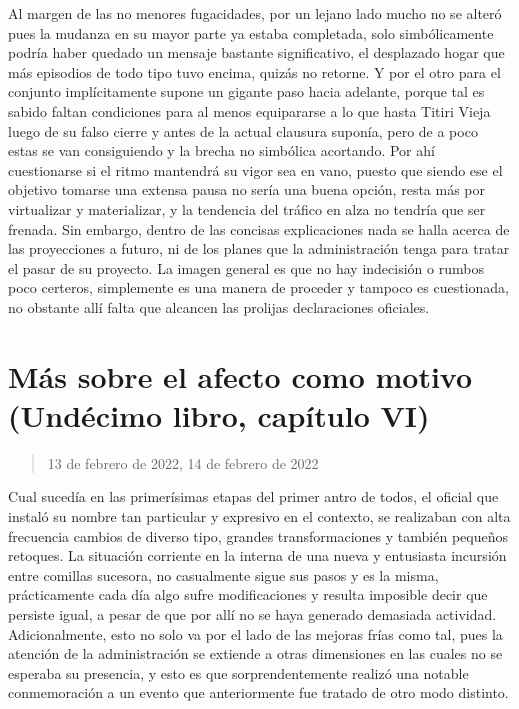 \documentclass[
]{book}
\begin{document}
Al margen de las no menores fugacidades, por un lejano lado mucho no se alteró pues la mudanza en su mayor parte ya estaba completada, solo simbólicamente podría haber quedado un mensaje bastante significativo, el desplazado hogar que más episodios de todo tipo tuvo encima, quizás no retorne. Y por el otro para el conjunto implícitamente supone un gigante paso hacia adelante, porque tal es sabido faltan condiciones para al menos equipararse a lo que hasta Titiri Vieja luego de su falso cierre y antes de la actual clausura suponía, pero de a poco estas se van consiguiendo y la brecha no simbólica acortando. Por ahí cuestionarse si el ritmo mantendrá su vigor sea en vano, puesto que siendo ese el objetivo tomarse una extensa pausa no sería una buena opción, resta más por virtualizar y materializar, y la tendencia del tráfico en alza no tendría que ser frenada. Sin embargo, dentro de las concisas explicaciones nada se halla acerca de las proyecciones a futuro, ni de los planes que la administración tenga para tratar el pasar de su proyecto. La imagen general es que no hay indecisión o rumbos poco certeros, simplemente es una manera de proceder y tampoco es cuestionada, no obstante allí falta que alcancen las prolijas declaraciones oficiales.

\hypertarget{muxe1s-sobre-el-afecto-como-motivo-unduxe9cimo-libro-capuxedtulo-vi}{%
\section{Más sobre el afecto como motivo (Undécimo libro, capítulo VI)}\label{muxe1s-sobre-el-afecto-como-motivo-unduxe9cimo-libro-capuxedtulo-vi}}

\begin{quote}
13 de febrero de 2022, 14 de febrero de 2022
\end{quote}

Cual sucedía en las primerísimas etapas del primer antro de todos, el oficial que instaló su nombre tan particular y expresivo en el contexto, se realizaban con alta frecuencia cambios de diverso tipo, grandes transformaciones y también pequeños retoques. La situación corriente en la interna de una nueva y entusiasta incursión entre comillas sucesora, no casualmente sigue sus pasos y es la misma, prácticamente cada día algo sufre modificaciones y resulta imposible decir que persiste igual, a pesar de que por allí no se haya generado demasiada actividad. Adicionalmente, esto no solo va por el lado de las mejoras frías como tal, pues la atención de la administración se extiende a otras dimensiones en las cuales no se esperaba su presencia, y esto es que sorprendentemente realizó una notable conmemoración a un evento que anteriormente fue tratado de otro modo distinto.
\end{document}
